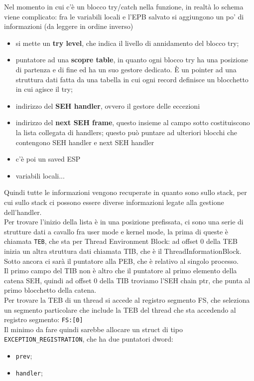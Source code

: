 \documentclass[12pt, oneside]{extbook}
\begin{document}
Nel momento in cui c'è un blocco try/catch nella funzione, in realtà lo schema viene complicato: fra le variabili locali e l'EPB salvato si aggiungono un po' di informazioni (da leggere in ordine inverso)
\begin{itemize}
\item si mette un \textbf{try level}, che indica il livello di annidamento del blocco try;
\item puntatore ad una \textbf{scopre table}, in quanto ogni blocco try ha una posizione di partenza e di fine ed ha un suo gestore dedicato. È un pointer ad una struttura dati fatta da una tabella in cui ogni record definisce un blocchetto in cui agisce il try;
\item indirizzo del \textbf{SEH handler}, ovvero il gestore delle eccezioni
\item indirizzo del \textbf{next SEH frame}, questo insieme al campo sotto costituiscono la lista collegata di handlers; questo può puntare ad ulteriori blocchi che contengono SEH handler e next SEH handler
\item c'è  poi un saved ESP
\item variabili locali...
\end{itemize}
Quindi tutte le informazioni vengono recuperate in quanto sono sullo stack, per cui sullo stack ci possono essere diverse informazioni legate alla gestione dell'handler.\\Per trovare l'inizio della lista è in una posizione prefissata, ci sono una serie di strutture dati a cavallo fra user mode e kernel mode, la prima di queste è chiamata \texttt{TEB}, che sta per Thread Environment Block: ad offset 0 della TEB inizia un altra struttura dati chiamata TIB, che è il ThreadInformationBlock. Sotto ancora ci sarà il puntatore alla PEB, che è relativo al singolo processo.\\Il primo campo del TIB non è altro che il puntatore al primo elemento della catena SEH, quindi ad offset 0 della TIB troviamo l'SEH chain ptr, che punta al primo blocchetto della catena.\\Per trovare la TEB di un thread si accede al registro segmento FS, che seleziona un segmento particolare che include la TEB del thread che sta accedendo al registro segmento: \texttt{FS:[0]}\\Il minimo da fare quindi sarebbe allocare un struct di tipo \texttt{EXCEPTION\_REGISTRATION}, che ha due puntatori dword:
\begin{itemize}
\item \texttt{prev};
\item \texttt{handler};
\end{itemize}
\end{document}
